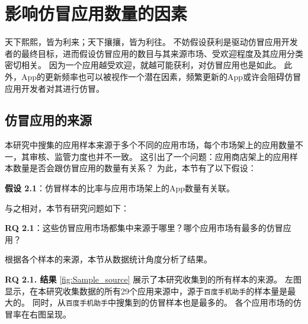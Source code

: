\section{影响仿冒应用数量的因素}
\label{sec:quantitativeStudy}
天下熙熙，皆为利来；天下攘攘，皆为利往。
不妨假设获利是驱动仿冒应用开发者的最终目标，进而假设仿冒应用的数目与其来源市场、受欢迎程度及其应用分类密切相关。
因为一个应用越受欢迎，就越可能获利，对仿冒应用也是如此。
此外，App的更新频率也可以被视作一个潜在因素，频繁更新的App或许会阻碍仿冒应用开发者对其进行仿冒。

\subsection{仿冒应用的来源}

本研究中搜集的应用样本来源于多个不同的应用市场，每个市场架上的应用数量不一，其审核、监管力度也并不一致。
这引出了一个问题：应用商店架上的应用样本数量是否会跟仿冒应用的数量有关系？
为此，本节有了以下假设：

{\bf 假设 2.1}：仿冒样本的比率与应用市场架上的App数量有关联。

与之相对，本节有研究问题如下：

{\bf RQ 2.1}：这些仿冒应用市场都集中来源于哪里？哪个应用市场有最多的仿冒应用？

根据各个样本的来源，本节从数据统计角度分析了结果。

{\bf RQ 2.1. 结果} \autoref{fig:Sample_source} 展示了本研究收集到的所有样本的来源。
左图显示，在本研究收集数据的所有29个应用来源中，源于\texttt{百度手机助手}的样本量是最大的。
同时，从\texttt{百度手机助手}中搜集到的仿冒样本也是最多的。
各个应用市场的仿冒率在右图呈现。

